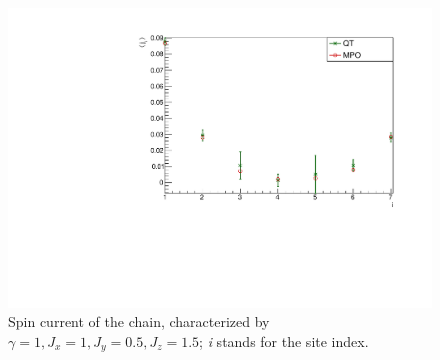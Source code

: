 \begin{figure}[H]
    \centering
    \includegraphics[scale=0.7]{Figures/8sites/SpinCurr_8s_J10515.pdf}
    \caption{Spin current of the chain, characterized by $\gamma=1, J_x=1, J_y=0.5, J_z=1.5$; \emph{i} stands for the site index.}
    \label{fig:my_label}
\end{figure}

%
%
%

